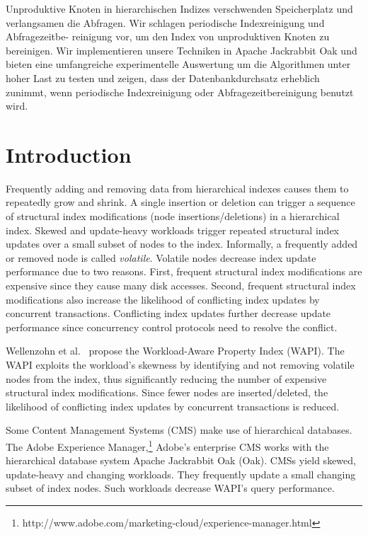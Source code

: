 \documentclass[abstracton,12pt]{scrartcl}
\theoremstyle{definition}
\begin{document}
Unproduktive Knoten in hierarchischen Indizes verschwenden Speicherplatz und
verlangsamen die Abfragen. Wir schlagen periodische Indexreinigung
und Abfragezeitbe- reinigung vor, um den Index von unproduktiven Knoten zu
bereinigen. Wir implementieren
unsere Techniken in Apache Jackrabbit Oak und bieten eine umfangreiche
experimentelle Auswertung um die Algorithmen unter hoher Last zu testen und
zeigen, dass der Datenbankdurchsatz erheblich zunimmt, wenn periodische
Indexreinigung oder Abfragezeitbereinigung benutzt wird.

\newpage
\thispagestyle{empty}

\tableofcontents

\newpage
\thispagestyle{empty}

\listoffigures

\newpage



\section{Introduction}

Frequently adding and removing data from hierarchical indexes causes them to
repeatedly grow and shrink. A single insertion or deletion can trigger a
sequence of structural index modifications (node insertions/deletions) in a
hierarchical index. Skewed and update-heavy workloads trigger repeated
structural index updates over a small subset of nodes to the index.
Informally, a frequently added or removed node is called \textit{volatile}.
Volatile nodes decrease index update performance due to two reasons. First,
frequent structural index modifications are expensive since they cause many disk
accesses. Second, frequent structural index modifications also increase the
likelihood of conflicting index updates by concurrent transactions. Conflicting
index updates further decrease update performance since concurrency control
protocols need to resolve the conflict.

Wellenzohn et al.~\cite{KW17} propose the Workload-Aware Property Index (WAPI).
The WAPI exploits the workload's skewness by identifying and not removing
volatile nodes from the index, thus significantly reducing the number of
expensive structural index modifications. Since fewer nodes are
inserted/deleted, the likelihood of conflicting index updates by concurrent
transactions is reduced.

Some Content Management Systems (CMS) make use of hierarchical databases. The Adobe
Experience
Manager,\footnote{http://www.adobe.com/marketing-cloud/experience-manager.html}
Adobe's enterprise CMS works with the hierarchical database system Apache
Jackrabbit Oak (Oak). CMSs yield skewed, update-heavy and changing
workloads. They frequently update a small changing subset of index nodes. Such
workloads decrease WAPI's query performance.
\end{document}
